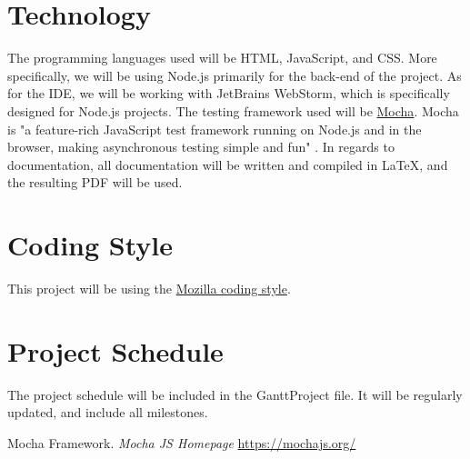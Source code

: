 \documentclass[12pt]{article}
\begin{document}
\section{Technology}
The programming languages used will be HTML, JavaScript, and CSS. More specifically, we will be using Node.js primarily for the back-end of the project. As for the IDE, we will be working with JetBrains WebStorm, which is specifically designed for Node.js projects. The testing framework used will be \href{https://mochajs.org/}{Mocha}. Mocha is "a feature-rich JavaScript test framework running on Node.js and in the browser, making asynchronous testing simple and fun" \cite{1}. In regards to documentation, all documentation will be written and compiled in \LaTeX , and the resulting PDF will be used.
\section{Coding Style}
This project will be using the \href{https://developer.mozilla.org/en-US/docs/Mozilla/Developer_guide/Coding_Style}{Mozilla coding style}.
\section{Project Schedule}
The project schedule will be included in the GanttProject file. It will be regularly updated, and include all milestones. 



\begin{thebibliography}{9}
Mocha Framework.
\textit{Mocha JS Homepage}
\url{https://mochajs.org/}


 
\end{thebibliography}
\end{document}
